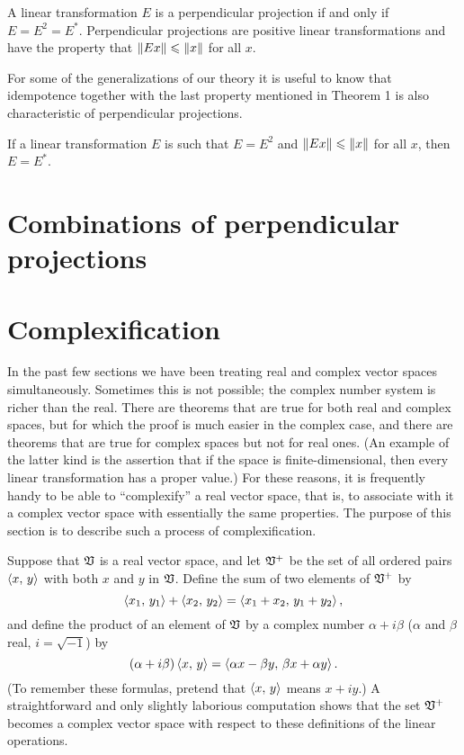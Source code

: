 \begin{theorem}
    A linear transformation \(E\) is a perpendicular projection if and only if
    \(E = E^2 = E^*\). Perpendicular projections are positive linear
    transformations and have the property that \(\left\lVert Ex\right\rVert \leqslant \left\lVert x\right\rVert\) for
    all \(x\).
\end{theorem}

For some of the generalizations of our theory it is useful to know that
idempotence together with the last property mentioned in Theorem 1 is also
characteristic of perpendicular projections.

\begin{theorem}
    If a linear transformation \(E\) is such that \(E = E^2\) and \(\left\lVert Ex\right\rVert
    \leqslant \left\lVert x\right\rVert\) for all \(x\), then \(E = E^*\).
\end{theorem}

\section{Combinations of perpendicular projections}

\section{Complexification}

In the past few sections we have been treating real and complex vector spaces
simultaneously. Sometimes this is not possible; the complex number system is
richer than the real. There are theorems that are true for both real and complex
spaces, but for which the proof is much easier in the complex case, and there
are theorems that are true for complex spaces but not for real ones. (An example
of the latter kind is the assertion that if the space is finite-dimensional,
then every linear transformation has a proper value.) For these reasons, it is
frequently handy to be able to ``complexify'' a real vector space, that is, to
associate with it a complex vector space with essentially the same properties.
The purpose of this section is to describe such a process of complexification.

Suppose that \(\mathfrak{V}\) is a real vector space, and let \(\mathfrak{V}^+\) be the set
of all ordered pairs \(\left\langle x,\,y\right\rangle\) with both \(x\) and \(y\) in \(\mathfrak{V}\).
Define the sum of two elements of \(\mathfrak{V}^+\) by
\begin{equation*}
    \left\langle x_1,\,y_1\right\rangle + \left\langle x_2,\,y_2\right\rangle = \left\langle x_1 + x_2,\,y_1 + y_2\right\rangle,
\end{equation*}
and define the product of an element of \(\mathfrak{V}\) by a complex number \(\alpha
+ i\beta\) (\(\alpha\) and \(\beta\) real, \(i = \sqrt{-1}\)) by
\begin{equation*}
    (\alpha + i\beta)\left\langle x,\,y\right\rangle = \left\langle\alpha x - \beta y,\,\beta x + \alpha y\right\rangle.
\end{equation*}
(To remember these formulas, pretend that \(\left\langle x,\,y\right\rangle\) means \(x + iy\).) A
straightforward and only slightly laborious computation shows that the set
\(\mathfrak{V}^+\) becomes a complex vector space with respect to these definitions of
the linear operations.

